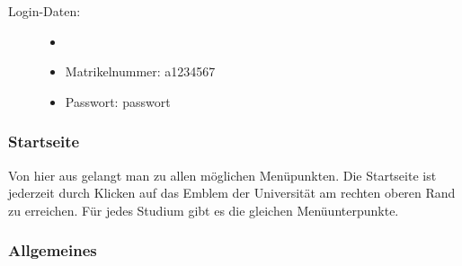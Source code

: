 \documentclass[a4paper,10pt]{scrartcl}
\begin{document}
\begin{description}
 \item[Login-Daten:] 
 \begin{itemize}
  \item[]
  \item Matrikelnummer: a1234567
  \item Passwort: passwort
 \end{itemize}

\end{description}

\subsubsection{Startseite}

\noindent{}
\medskip

Von hier aus gelangt man zu allen möglichen Menüpunkten. Die Startseite ist jederzeit durch Klicken auf das Emblem der Universität am rechten oberen Rand zu erreichen. Für jedes Studium gibt es die gleichen Menüunterpunkte.

\subsubsection{Allgemeines}

\noindent{}
\medskip
\end{document}
